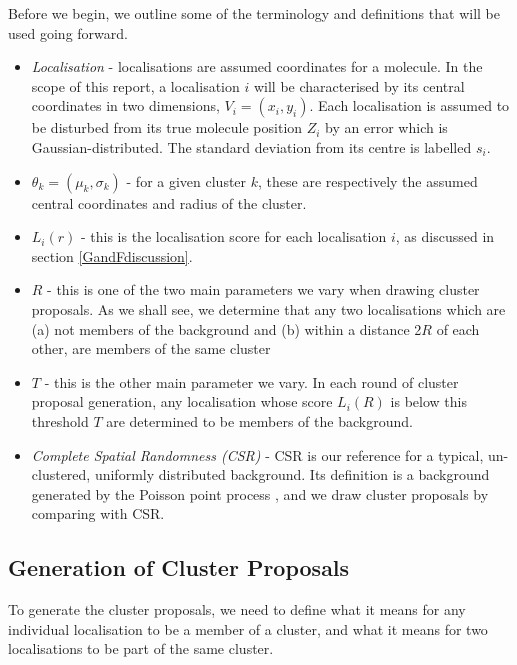 \documentclass[11pt]{article}
\begin{document}
Before we begin, we outline some of the terminology and definitions that will be used going forward.
\begin{itemize}
	\item \textit{Localisation} - localisations are assumed coordinates for a molecule. In the scope of this report, a localisation $i$ will be characterised by its central coordinates in two dimensions, $V_i = (x_i, y_i)$. Each localisation is assumed to be disturbed from its true molecule position $Z_i$ by an error which is Gaussian-distributed. The standard deviation from its centre is labelled $s_i$.
	\item $\theta_k = (\mu_k, \sigma_k)$ - for a given cluster $k$, these are respectively the assumed central coordinates and radius of the cluster.
	\item $L_i(r)$ - this is the localisation score for each localisation $i$, as discussed in section \ref{GandFdiscussion}.
	\item $R$ - this is one of the two main parameters we vary when drawing cluster proposals. As we shall see, we determine that any two localisations which are (a) not members of the background and (b) within a distance 2$R$ of each other, are members of the same cluster
	\item $T$ - this is the other main parameter we vary. In each round of cluster proposal generation, any localisation whose score $L_i(R)$ is below this threshold $T$ are determined to be members of the background.
	\item \textit{Complete Spatial Randomness (CSR)} - CSR is our reference for a typical, un-clustered, uniformly distributed background. Its definition is a background generated by the Poisson point process \cite{getisAndFranklin}, and we draw cluster proposals by comparing with CSR. 

\end{itemize}

\subsection{Generation of Cluster Proposals}

To generate the cluster proposals, we need to define what it means for any individual localisation to be a member of a cluster, and what it means for two localisations to be part of the same cluster.
\end{document}
